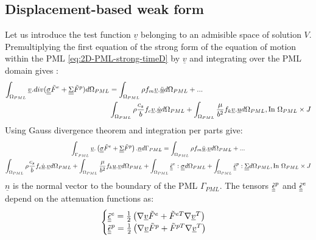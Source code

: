 \subsection{Displacement-based weak form}
Let us introduce the test function $\underline{v}$ belonging to an admisible space of solution $V$. Premultiplying the first equation of the strong form of the equation of motion within the PML \ref{eq:2D-PML-strong-timeD} by $\underline{v}$ and integrating over the PML domain gives :
\begin{align}
\int_{\Omega_{PML}} \underline{v}.div(\underline{\underline{\sigma}}\tilde{F}^e + \underline{\underline{\Sigma}}\tilde{F}^p) d\Omega_{PML} & = \int_{\Omega_{PML}} \rho f_m \underline{v}.\underline{\ddot{u}} d\Omega_{PML} + ... \nonumber\\
&  \int_{\Omega_{PML}} \rho \frac{c_s}{b} f_c \underline{v}.\underline{\dot{u}} d\Omega_{PML} +  \int_{\Omega_{PML}} \frac{\mu}{b^2}f_k \underline{v}. \underline{u}  d\Omega_{PML},  \text{In } \Omega_{PML} \times J 
\end{align}
Using Gauss divergence theorem and integration per parts give:
\begin{multline}
\int_{\Gamma_{PML}} \underline{v} .\left(\underline{\underline{\sigma}}\tilde{F}^e + \underline{\underline{\Sigma}}\tilde{F}^p \right).\underline{n} d\Gamma_{PML}  = \int_{\Omega_{PML}} \rho f_m \underline{\ddot{u}} . \underline{v} d\Omega_{PML} + ... \nonumber\\
\int_{\Omega_{PML}} \rho \frac{c_s}{b} f_c \underline{\dot{u}} . \underline{v} d\Omega_{PML} +  \int_{\Omega_{PML}} \frac{\mu}{b^2}f_k \underline{u} . \underline{v} d\Omega_{PML} +\int_{\Omega_{PML}} \underline{\underline{\tilde{\epsilon}}}^e : \underline{\underline{\sigma}} d\Omega_{PML} + \int_{\Omega_{PML}} \underline{\underline{\tilde{\epsilon}}}^p : \underline{\underline{\Sigma}} d\Omega_{PML},  \text{In } \Omega_{PML} \times J 
\label{eq:weak-form-motion}
\end{multline}
$\underline{n}$ is the normal vector to the boundary of the PML $\Gamma_{PML}$. The tensors $\underline{\underline{\tilde{\epsilon}}}^p$ and $\underline{\underline{\tilde{\epsilon}}}^e$ depend on the attenuation functions as:
\begin{equation}
\begin{cases}
\underline{\underline{\tilde{\epsilon}}}^e = \frac{1}{2}\left(\nabla \underline{v} \tilde{F}^e + \tilde{F}^{eT} \nabla \underline{v}^T  \right) \\
\underline{\underline{\tilde{\epsilon}}}^p = \frac{1}{2}\left(\nabla \underline{v} \tilde{F}^p + \tilde{F}^{pT} \nabla \underline{v}^T  \right)
\end{cases}
\label{eq:weak-first-eq}
\end{equation}

